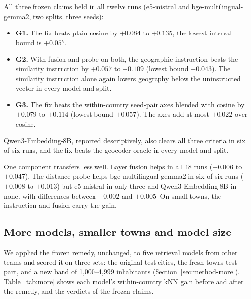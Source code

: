 All three frozen claims held in all twelve runs (e5-mistral and bge-multilingual-gemma2, two splits, three seeds):
\begin{itemize}
\item \textbf{G1.} The fix beats plain cosine by $+0.084$ to $+0.135$; the lowest interval bound is $+0.057$.
\item \textbf{G2.} With fusion and probe on both, the geographic instruction beats the similarity instruction by $+0.057$ to $+0.109$ (lowest bound $+0.043$). The similarity instruction alone again lowers geography below the uninstructed vector in every model and split.
\item \textbf{G3.} The fix beats the within-country seed-pair axes blended with cosine by $+0.079$ to $+0.114$ (lowest bound $+0.057$). The axes add at most $+0.022$ over cosine.
\end{itemize}
Qwen3-Embedding-8B, reported descriptively, also clears all three criteria in six of six runs, and the fix beats the geocoder oracle in every model and split.

One component transfers less well. Layer fusion helps in all 18 runs ($+0.006$ to $+0.047$). The distance probe helps bge-multilingual-gemma2 in six of six runs ($+0.008$ to $+0.013$) but e5-mistral in only three and Qwen3-Embedding-8B in none, with differences between $-0.002$ and $+0.005$. On small towns, the instruction and fusion carry the gain.

\subsection{More models, smaller towns and model size}
\label{sec:res-more}

We applied the frozen remedy, unchanged, to five retrieval models from other teams and scored it on three sets: the original test cities, the fresh-towns test part, and a new band of 1,000--4,999 inhabitants (Section~\ref{sec:method-more}). Table~\ref{tab:more} shows each model's within-country kNN gain before and after the remedy, and the verdicts of the frozen claims.

